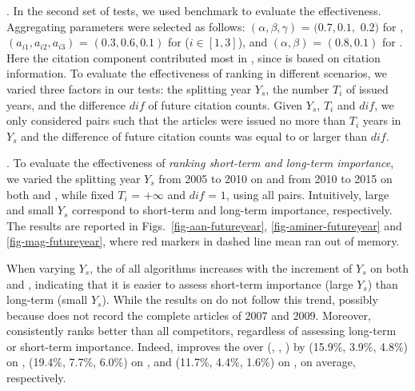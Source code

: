 .
In the second set of tests, we used benchmark \fcita to evaluate the effectiveness.
Aggregating parameters were selected as follows: $(\alpha, \beta, \gamma)$ = $(0.7, 0.1,$ $0.2)$ for \futurerank, $(a_{i1}, a_{i2}, a_{i3})$ = $(0.3, 0.6, 0.1)$ for \hhgrank ($i\in[1, 3]$), and $(\alpha, \beta)$ = $(0.8, 0.1)$ for \ensemblerank.
Here the citation component contributed most in \ensemblerank, since \fcita is based on citation information.
To evaluate the effectiveness of ranking in different scenarios, we varied three factors in our tests: the splitting year $Y_s$, the number $T_i$ of issued years, and the difference $dif$ of future citation counts.
%
Given $Y_s$, $T_i$ and $dif$, we only considered pairs such that the articles were issued no more than $T_i$ years in $Y_s$ and the difference of future citation counts was equal to or larger than $dif$.


.
To evaluate the effectiveness of {\em ranking short-term and long-term importance},
we varied the splitting year $Y_s$ from 2005 to 2010 on \aan and from 2010 to 2015 on both \aminer and \magdata, while fixed $T_i$ = $+\infty$ and $dif$ = $1$, \ie using all pairs.
%
Intuitively, large and small $Y_s$ correspond to short-term and long-term importance, respectively.
The results are reported in Figs.~\ref{fig-aan-futureyear}, \ref{fig-aminer-futureyear} and \ref{fig-mag-futureyear}, where red markers \marked{$\Box$} in dashed line mean \hhgrank ran out of memory.


When varying $Y_s$, the \PairAcc of all algorithms increases with the increment of $Y_s$ on both \aminer and \magdata, indicating that it is easier to assess short-term importance (large $Y_s$) than long-term (small $Y_s$). While the results on \aan do not follow this trend, possibly because \aan does not record the complete articles of 2007 and 2009.
Moreover, \ensemblerank consistently ranks better than all competitors, regardless of assessing long-term or short-term importance.
Indeed, \ensemblerank improves the \PairAcc over (\pagerank, \futurerank, \hhgrank) by (15.9\%, 3.9\%, 4.8\%) on \aan, (19.4\%, 7.7\%, 6.0\%) on \aminer, and  (11.7\%, 4.4\%, 1.6\%) on \magdata, on average, respectively.



